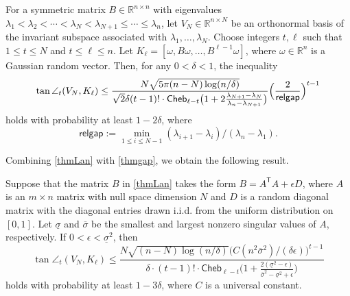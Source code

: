 \documentclass{siamart190516}
\newcommand{\Ttran}{\mathsf{T}}
\newcommand{\R}{\mathbb{R}}
\newcommand{\cheb}{\mathsf{Cheb}}
\newcommand{\gap}{\mathsf{relgap}}
\begin{document}
\begin{theorem}
    \label{thmLan}
    For a symmetric matrix $B\in\R^{n\times n}$ with eigenvalues $\lambda_{1}<\lambda_{2}<\dotsb<\lambda_{N}<\lambda_{N+1}\leq \dotsb\leq \lambda_{n}$, let $V_{N} \in \R^{n\times N}$ be an orthonormal basis of the invariant subspace associated with $\lambda_1,\dotsc,\lambda_N$. Choose integers $t,\ell$ such that $1\leq t\leq N$ and $t\leq \ell\leq n$.
    Let $K_{\ell}=[\omega,B\omega,\dotsc,B^{\ell-1}\omega]$, where $\omega\in\R^{n}$ is a Gaussian random vector. Then, for any $0<\delta<1$, the inequality
    \begin{equation}
        \label{eqLan}
        \tan\angle_{t}(V_{N},K_{\ell}) \leq 
        \frac{N\sqrt{5\pi (n-N)\log(n/\delta)}}{\sqrt{2}\delta(t-1)!\cdot\cheb_{\ell-t}\bigl(1+2\frac{\lambda_{N+1}-\lambda_{N}}{\lambda_{n}-\lambda_{N+1}}\bigr)}\Bigl(\frac{2}{\gap}\Bigr)^{t-1}
    \end{equation}
    holds with probability at least $1-2\delta$,
    where
    \begin{equation}
        \label{defgap}
        \gap := \min_{1\leq i\leq N-1}( \lambda_{i+1}-\lambda_{i} ) / (\lambda_{n}-\lambda_{1}).
    \end{equation}   
\end{theorem}

\noindent Combining \cref{thmLan} with \cref{thmgap}, we obtain the following result.
\begin{corollary}
    \label{corLan}
    Suppose that the matrix $B$ in \cref{thmLan} takes the form $B=A^{\Ttran}A+\epsilon D$, where $A$ is an $m\times n$ matrix with null space dimension $N$ and $D$ is a random diagonal matrix with the diagonal entries drawn i.i.d. from the uniform distribution on $[0,1]$. Let $\underline{\sigma}$ and $\overline{\sigma}$ be the smallest and largest nonzero singular values of $A$, respectively. 
    If $0<\epsilon< \underline{\sigma}^{2}$, then 
    \begin{equation}
        \label{coreqtan}
        \tan\angle_{t}(V_{N},K_{\ell}) \leq \frac{N\sqrt{(n-N)\log(n/\delta)}\bigl(C(n^{2}\overline{\sigma}^{2})/(\delta\epsilon)\bigr)^{t-1}}
        {\delta\cdot(t-1)!\cdot\cheb_{\ell-t}\bigl(1+\frac{2(\underline{\sigma}^{2}-\epsilon)}{\overline{\sigma}^{2}-\underline{\sigma}^{2}+\epsilon}\bigr)}
    \end{equation}
    holds with probability at least $1-3\delta$, where $C$ is a universal constant.
\end{corollary}
\end{document}
